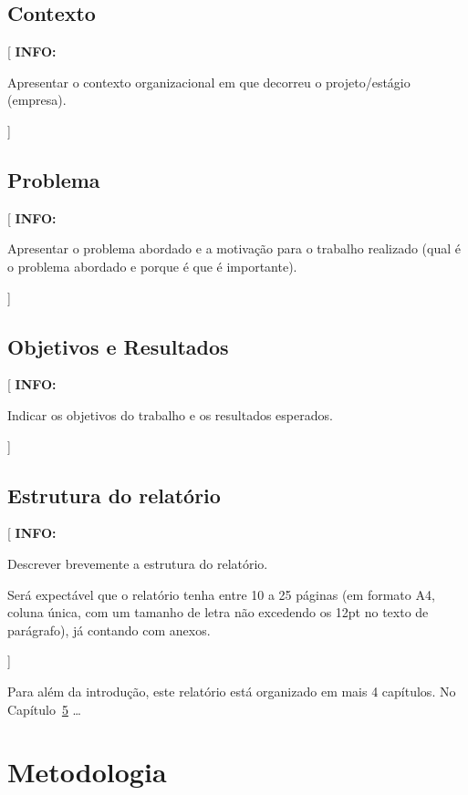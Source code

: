 \documentclass[11pt,a4paper]{report}
\newenvironment{info}[1]{\vspace*{6mm}\color{blue}[ \textbf{INFO:} \begin{em} #1}{\vspace*{3mm}\end{em} ]}
\begin{document}
\section{Contexto}

\begin{info}
Apresentar o contexto organizacional em que decorreu o projeto/estágio (empresa).
\end{info}

\section{Problema}

\begin{info}
Apresentar o problema abordado e a motivação para o trabalho
realizado (qual é o problema abordado e porque é que é importante).
\end{info}

\section{Objetivos e Resultados}

\begin{info}
Indicar os objetivos do trabalho e os resultados esperados.
\end{info}

\section{Estrutura do relatório}
	
\begin{info}
  Descrever brevemente a estrutura do relatório.

  Será expectável que o relatório tenha entre 10 a 25 páginas (em formato A4, coluna única, com um tamanho de letra não excedendo os 12pt no texto de parágrafo), já contando com anexos. 
\end{info}

Para além da introdução, este relatório está organizado em mais 4 capítulos.
No Capítulo~\ref{chap:metodo} \ldots


\newpage  %



\chapter{Metodologia} \label{chap:metodo}
\end{document}
